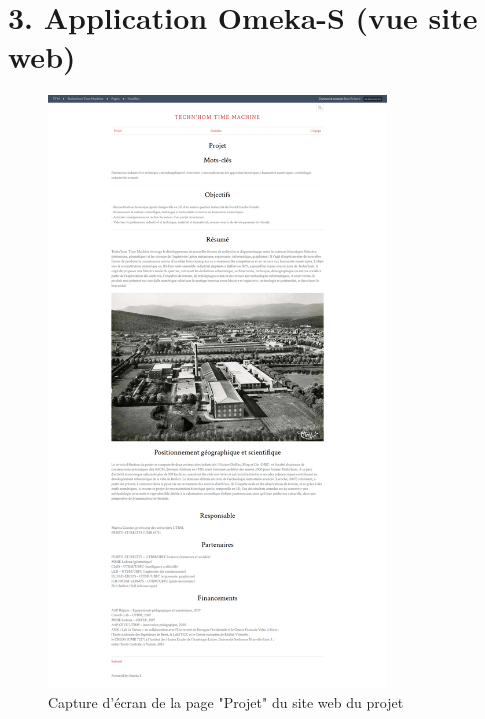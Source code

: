 \section*{3. Application Omeka-S (vue site web)}\label{annexe3}
\begin{figure} [H]
    \centering
    \includegraphics[width=0.8\textwidth]{assets/annexes/omeka_projet.png}
    \caption{Capture d'écran de la page "Projet" du site web du projet}
    \label{fig:pageProjetOmeka}
\end{figure}
